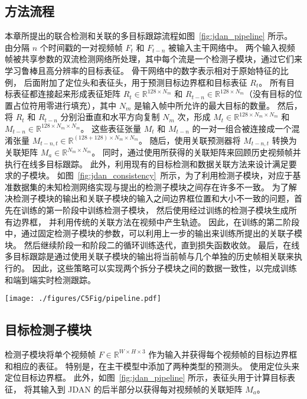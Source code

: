 \subsection{方法流程}
本章所提出的联合检测和关联的多目标跟踪流程如图~\ref{fig:jdan_pipeline} 所示。
由分隔 $n$ 个时间戳的一对视频帧 $F_t$ 和 $F_{t-n}$ 被输入主干网络中。
两个输入视频帧被共享参数的双流检测网络所处理，其中每个流是一个检测子模块，通过它们来学习鲁棒且高分辨率的目标表征。
%
骨干网络中的数字表示相对于原始特征的比例，
后面附加了定位头和表征头，用于预测目标边界框和目标表征 $R_t$。
%
所有目标表征都连接起来形成表征矩阵 $R_t \in \mathbb{R}^{128 \times N_m}$ 和 $R_{t-n} \in \mathbb{R}^{128 \times N_m}$（没有目标的位置占位符用零进行填充），其中 $N_m$ 是输入帧中所允许的最大目标的数量。
然后，将 $R_t$ 和 $R_{t-n}$ 分别沿垂直和水平方向复制 $N_m$ 次，形成 $M_t \in \mathbb R^{128 \times N_m \times N_m}$ 和 $M_ {t-n} \in \mathbb R^{128 \times N_m \times N_m}$。
这些表征张量 $M_t$ 和 $M_{t-n}$ 的一对一组合被连接成一个混淆张量 $M_{t-n,t} \in \mathbb R^{(128+128) \times N_m \times N_m}$。
随后，使用关联预测器将 $M_{t-n,t}$ 转换为关联矩阵 $M_a \in \mathbb R^{N_m \times N_m}$。
同时，通过使用所获得的关联矩阵来回顾历史视频帧并执行在线多目标跟踪。
此外，利用现有的目标检测和数据关联方法来设计满足要求的子模块。
如图~\ref{fig:jdan_consistency}~所示，为了利用检测子模块，对应于基准数据集的未知检测网络实现与提出的检测子模块之间存在许多不一致。
为了解决检测子模块的输出和关联子模块的输入之间边界框位置和大小不一致的问题，首先在训练的第一阶段中训练检测子模块，
然后使用经过训练的检测子模块生成所有边界框，
并利用传统的关联方法在视频中产生轨迹。
因此，在训练的第二阶段中，通过固定检测子模块的参数，可以利用上一步的输出来训练所提出的关联子模块。
然后继续阶段一和阶段二的循环训练迭代，直到损失函数收敛。
最后，在线多目标跟踪是通过使用关联子模块的输出将当前帧与几个单独的历史帧相关联来执行的。
因此，这些策略可以实现两个拆分子模块之间的数据一致性，以完成训练和端到端实时检测跟踪。


\begin{figure*}[ht]
	\centering
	\texttt{[image: ./figures/C5Fig/pipeline.pdf]}
	\vspace{0.2em}
	\caption{联合检测关联的网络架构图}
	\label{fig:jdan_pipeline}
\end{figure*}

\subsection{目标检测子模块}
\label{sec:detection_submodule}
检测子模块将单个视频帧 $F \in \mathbb{R} ^ {W \times H \times 3}$ 作为输入并获得每个视频帧的目标边界框和相应的表征。
特别是，在主干模型中添加了两种类型的预测头。
使用定位头来定位目标边界框。
此外，如图~\ref{fig:jdan_pipeline} 所示，表征头用于计算目标表征，
将其输入到 JDAN 的后半部分以获得每对视频帧的关联矩阵 $M_a$。

